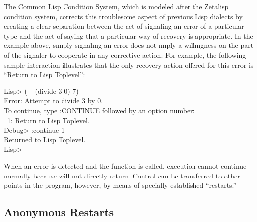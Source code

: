 The Common Lisp Condition System, which is modeled after the Zetalisp condition system,
corrects this troublesome aspect of previous Lisp dialects by creating a clear
separation between the act of signaling an error of a particular type and the
act of saying that a particular way of recovery is appropriate. In the 
example above, simply signaling an error does not imply a willingness on the
part of the signaler to cooperate in any corrective action. For example, the
following sample interaction illustrates that the only recovery action
offered for this error is ``Return to Lisp Toplevel'':
\begin{lisp}
Lisp> (+ (divide 3 0) 7) \\
Error: Attempt to divide 3 by 0. \\
To continue, type :CONTINUE followed by an option number: \\
~1: Return to Lisp Toplevel. \\
Debug> :continue 1 \\
Returned to Lisp Toplevel. \\
Lisp>
\end{lisp}
When an error is detected and the function  is called, execution cannot
continue normally because  will not directly return. Control can be
transferred to other points in the program, however, by means of specially
established ``restarts.''

\subsection{Anonymous Restarts}

